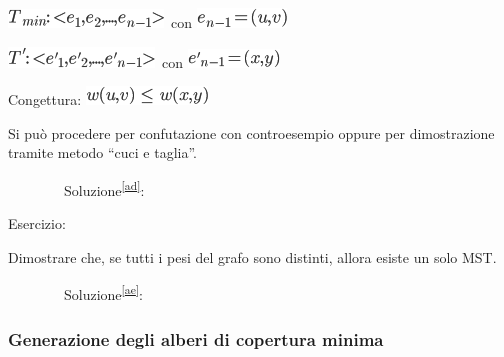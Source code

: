 \documentclass{article}
\begin{document}
{}

\includegraphics{images/image476.png}{~con
}\includegraphics{images/image477.png}

\includegraphics{images/image478.png}{~con
}\includegraphics{images/image479.png}

{}

{Congettura: }\includegraphics{images/image457.png}{~}

{Si può procedere per confutazione con controesempio oppure per
dimostrazione tramite metodo ``cuci e taglia''.}

{}

{~~~~~~~~}{Soluzione}\textsuperscript{\protect\hyperlink{cmnt30}{{[}ad{]}}}{:}

{}

{Esercizio}{:}

{Dimostrare che, se tutti i pesi del grafo sono distinti, allora esiste
un solo MST.}

{}

{~~~~~~~~}{Soluzione}\textsuperscript{\protect\hyperlink{cmnt31}{{[}ae{]}}}{:}

{}

\hypertarget{h.42rszsg7qe80}{\subsubsection{\texorpdfstring{{Generazione
degli alberi di copertura
minima}}{Generazione degli alberi di copertura minima}}\label{h.42rszsg7qe80}}

\protect\hypertarget{t.89c877068ffb6efc80378955af5aa00fb054212d}{}{}\protect\hypertarget{t.40}{}{}
\end{document}
